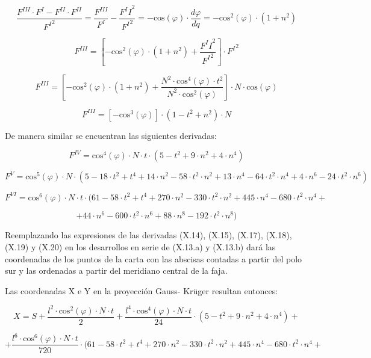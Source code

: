 \documentclass[]{article}
\begin{document}
\[\frac{F^{III}\cdot F^I-F^{II}\cdot F^{II}}{{F^I}^2}=\frac{F^{III}}{F^I}-\frac{{F^II}^2}{{F^I}^2}=-\text{cos}\left(\varphi \right)\cdot {\frac{\mathit{d\varphi}}{dq}}=-\text{cos}^2\left(\varphi \right)\cdot \left(1+n^2\right)\]

\[F^{III}=\left[-\text{cos}^2\left(\varphi \right)\cdot \left(1+n^2\right)+\frac{{F^II}^2}{{F^I}^2}\right]\cdot {F^I}^2\]

\[F^{III}=\left[-\text{cos}^2\left(\varphi \right)\cdot \left(1+n^2\right)+\frac{N^2\cdot \text{cos}^4\left(\varphi \right)\cdot t^2}{N^2\cdot \text{cos}^2\left(\varphi \right)}\right]\cdot N\cdot \text{cos}\left(\varphi \right)\]

\[F^{III}=\left[-\text{cos}^3\left(\varphi \right)\right]\cdot \left(1-t^2+n^2\right)\cdot N\]

De manera similar se encuentran las siguientes derivadas:

\[F^{IV}=\text{cos}^4\left(\varphi \right)\cdot N\cdot t\cdot \left(5-t^2+9\cdot n^2+4\cdot n^4\right)\]

\[F^V=\text{cos}^5\left(\varphi \right)\cdot N\cdot \left(5-\text{18}\cdot t^2+t^4+\text{14}\cdot n^2-\text{58}\cdot t^2\cdot n^2+\text{13}\cdot n^4-\text{64}\cdot t^2\cdot n^4+4\cdot n^6-\text{24}\cdot t^2\cdot n^6\right)\]

\[F^{VI}=\text{cos}^6\left(\varphi \right)\cdot N\cdot t\cdot (\text{61}-\text{58}\cdot t^2+t^4+\text{270}\cdot n^2-\text{330}\cdot t^2\cdot n^2+\text{445}\cdot n^4-\text{680}\cdot t^2\cdot n^4+\]

\[+\text{44}\cdot n^6-\text{600}\cdot t^2\cdot n^6+\text{88}\cdot n^8-\text{192}\cdot t^2\cdot n^8)\]

Reemplazando las expresiones de las derivadas (X.14), (X.15), (X.17),
(X.18), (X.19) y (X.20) en los desarrollos en serie de (X.13.a) y
(X.13.b) dará las coordenadas de los puntos de la carta con las abscisas
contadas a partir del polo sur y las ordenadas a partir del meridiano
central de la faja.

Las coordenadas X e Y en la proyección Gauss- Krüger resultan entonces:

\[X=S+\frac{l^2\cdot \text{cos}^2\left(\varphi \right)\cdot N\cdot t}{2}+\frac{l^4\cdot \text{cos}^4\left(\varphi \right)\cdot N\cdot t}{\text{24}}\cdot \left(5-t^2+9\cdot n^2+4\cdot n^4\right)+\]

\[+{\frac{l^6\cdot \text{cos}^6\left(\varphi \right)\cdot N\cdot t}{\text{720}}}\cdot (\text{61}-\text{58}\cdot t^2+t^4+\text{270}\cdot n^2-\text{330}\cdot t^2\cdot n^2+\text{445}\cdot n^4-\text{680}\cdot t^2\cdot n^4+\]
\end{document}
